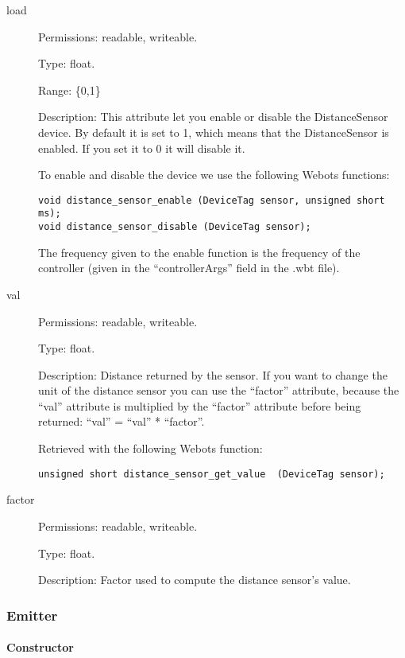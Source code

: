 \noindent
\begin{description}
\item[{load}]     Permissions: readable, writeable.


  Type: float.


  Range: \{0,1\}


  Description: This attribute let you enable or disable the
  DistanceSensor device.  By default it is set to 1, which means that
  the DistanceSensor is enabled. If you set it to 0 it will disable
  it.


  To enable and disable the device we use the following Webots
  functions:


\begin{lstlisting}
void distance_sensor_enable (DeviceTag sensor, unsigned short ms);
void distance_sensor_disable (DeviceTag sensor);
\end{lstlisting}

The frequency given to the enable function is the frequency of the
\urbi controller (given in the ``controllerArgs'' field in the .wbt
file).

\item[{         val
 }]            Permissions: readable, writeable.


 Type: float.


 Description: Distance returned by the sensor. If you want to change
 the unit of the distance sensor you can use the ``factor'' attribute,
 because the ``val'' attribute is multiplied by the ``factor'' attribute
 before being returned: ``val'' = ``val'' * ``factor''.


 Retrieved with the following Webots function:


\begin{lstlisting}
unsigned short distance_sensor_get_value  (DeviceTag sensor);
\end{lstlisting}
\item[{factor}] Permissions: readable, writeable.


  Type: float.


  Description: Factor used to compute the distance sensor's value.

\end{description}

\subsubsection{Emitter}
\label{webots.uobjects.robotdevices.emitter}%

\paragraph{Constructor}
\label{webots.uobjects.robotdevices.emitter.constructor}%

